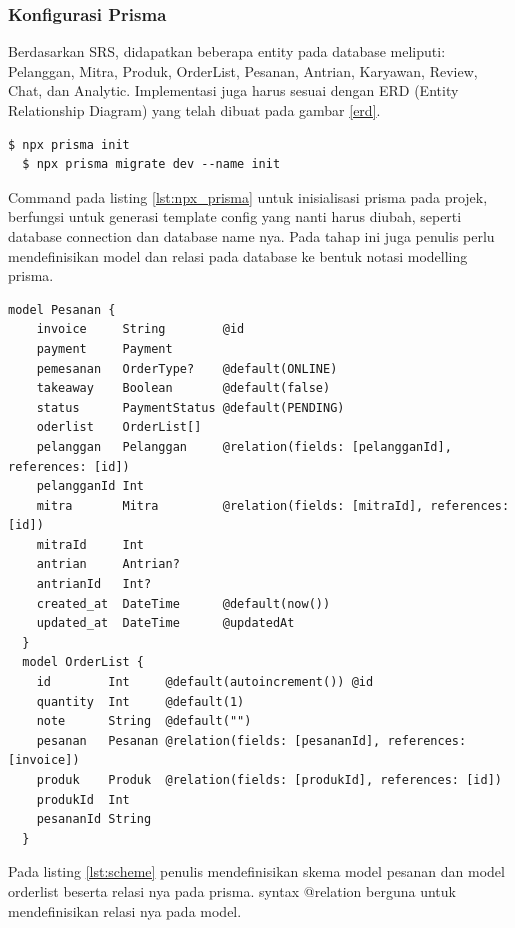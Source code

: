 \subsubsection{Konfigurasi Prisma}
Berdasarkan SRS, didapatkan beberapa entity pada database meliputi: Pelanggan, Mitra, Produk, OrderList, Pesanan, Antrian, Karyawan, Review, Chat, dan Analytic. Implementasi juga harus sesuai dengan ERD (Entity Relationship Diagram) yang telah dibuat pada gambar \ref{erd}.
\begin{lstlisting}[caption={terminal: npx},label={lst:npx_prisma}]
  $ npx prisma init
  $ npx prisma migrate dev --name init
\end{lstlisting}
Command pada listing \ref{lst:npx_prisma} untuk inisialisasi prisma pada projek, berfungsi untuk generasi template config yang nanti harus diubah, seperti database connection dan database name nya.
Pada tahap ini juga penulis perlu mendefinisikan model dan relasi pada database ke bentuk notasi modelling prisma.
\begin{lstlisting}[caption={scheme.prisma},label={lst:scheme}]
  model Pesanan {
    invoice     String        @id
    payment     Payment
    pemesanan   OrderType?    @default(ONLINE)
    takeaway    Boolean       @default(false)
    status      PaymentStatus @default(PENDING)
    oderlist    OrderList[]
    pelanggan   Pelanggan     @relation(fields: [pelangganId], references: [id])
    pelangganId Int
    mitra       Mitra         @relation(fields: [mitraId], references: [id])
    mitraId     Int
    antrian     Antrian?
    antrianId   Int?
    created_at  DateTime      @default(now())
    updated_at  DateTime      @updatedAt
  }
  model OrderList {
    id        Int     @default(autoincrement()) @id
    quantity  Int     @default(1)
    note      String  @default("")
    pesanan   Pesanan @relation(fields: [pesananId], references: [invoice])
    produk    Produk  @relation(fields: [produkId], references: [id])
    produkId  Int
    pesananId String
  }
\end{lstlisting}
Pada listing \ref{lst:scheme} penulis mendefinisikan skema model pesanan dan model orderlist beserta relasi nya pada prisma. syntax @relation berguna untuk mendefinisikan relasi nya pada model.

